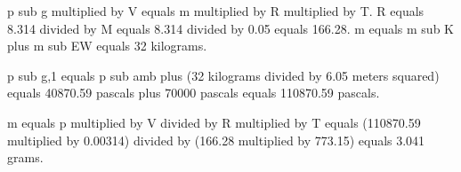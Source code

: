 p sub g multiplied by V equals m multiplied by R multiplied by T.  
R equals 8.314 divided by M equals 8.314 divided by 0.05 equals 166.28.  
m equals m sub K plus m sub EW equals 32 kilograms.  

p sub g,1 equals p sub amb plus (32 kilograms divided by 6.05 meters squared) equals 40870.59 pascals plus 70000 pascals equals 110870.59 pascals.  

m equals p multiplied by V divided by R multiplied by T equals (110870.59 multiplied by 0.00314) divided by (166.28 multiplied by 773.15) equals 3.041 grams.